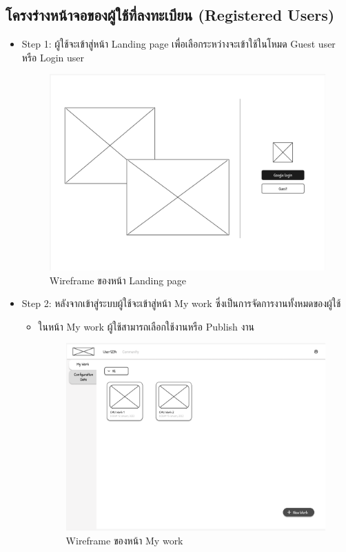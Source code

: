\begin{mypara}
\begin{itemize}
\end{itemize} 


\subsection{โครงร่างหน้าจอของผู้ใช้ที่ลงทะเบียน (Registered Users)}
\begin{itemize}
    \item Step 1:  ผู้ใช้จะเข้าสู่หน้า Landing page เพื่อเลือกระหว่างจะเข้าใช้ในโหมด Guest user หรือ Login user
    \begin{figure}[H]
    \centering
    \includegraphics[scale=0.4]
    {homepage.png}
    \caption{Wireframe ของหน้า Landing page}
    \label{fig:WireframeHomepageLogin}
    \end{figure}

    \newpage
    \item Step 2: หลังจากเข้าสู่ระบบผู้ใช้จะเข้าสู่หน้า My work ซึ่งเป็นการจัดการงานทั้งหมดของผู้ใช้
    \begin{itemize}
      \item ในหน้า My work ผู้ใช้สามารถเลือกใช้งานหรือ Publish งาน
        \begin{figure}[H]
          \centering
          \includegraphics[scale=0.4]{my_work.png} 
          \caption{Wireframe ของหน้า My work}
          \label{fig:WireframeMyWork}
        \end{figure}


\end{itemize}
\end{itemize}
\end{mypara}
